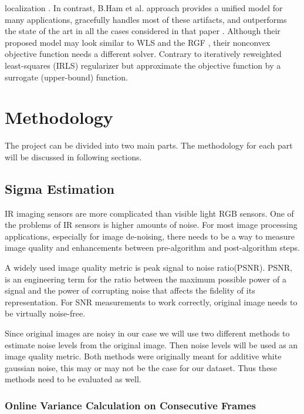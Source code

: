 \documentclass[10pt,twocolumn,letterpaper]{article}
\begin{document}
localization \cite{yan2013cross}. In contrast, B.Ham et al. approach provides a unified model for many applications, gracefully handles most of these artifacts, and outperforms the state of the art in all the cases considered in that paper \cite{ham2015}. Although their proposed model may look similar to WLS \cite{farbman2008edge} and the RGF \cite{yan2013cross}, their nonconvex objective function needs a different solver. Contrary to iteratively reweighted least-squares (IRLS) \cite{daubechies2010iteratively} regularizer but approximate the objective function by a surrogate (upper-bound) function.


\section{Methodology}
The project can be divided into two main parts. The methodology for each part will be discussed in following sections.

\subsection{Sigma Estimation}
IR imaging sensors are more complicated than visible light RGB sensors. One of the problems of IR sensors is higher amounts of noise.
For most image processing applications, especially for image de-noising, there needs to be a way to measure image quality and enhancements between pre-algorithm and post-algorithm steps.

A widely used image quality metric is peak signal to noise ratio(PSNR). PSNR, is an engineering term for the ratio between the maximum possible power of a signal and the power of corrupting noise that affects the fidelity of its representation\cite{psnr-wiki}. For SNR measurements to work correctly, original image needs to be virtually noise-free.

Since original images are noisy in our case we will use two different methods to estimate noise levels from the original image. Then noise levels will be used as an image quality metric. Both methods were originally meant for additive white gaussian noise, this may or may not be the case for our dataset. Thus these methods need to be evaluated as well.
\subsubsection{Online Variance Calculation on Consecutive Frames}
\end{document}
